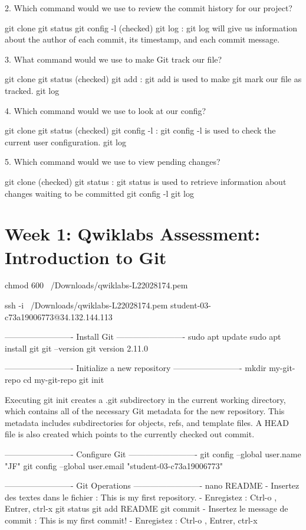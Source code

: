 \documentclass[11pt, onecolumn]{article}
\begin{document}
2. Which command would we use to review the commit history for our project?

git clone
git status
git config -l
(checked) git log : git log will give us information about the author of each commit, its timestamp, and each commit message.


3. What command would we use to make Git track our file?

git clone
git status
(checked) git add : git add is used to make git mark our file as tracked.
git log


4. Which command would we use to look at our config?

git clone
git status
(checked) git config -l  : git config -l is used to check the current user configuration.
git log


5. Which command would we use to view pending changes?

git clone
(checked) git status : git status is used to retrieve information about changes waiting to be committed
git config -l
git log


\section{Week 1: Qwiklabs Assessment: Introduction to Git}

chmod 600 ~/Downloads/qwiklabs-L22028174.pem

ssh -i ~/Downloads/qwiklabs-L22028174.pem student-03-c73a19006773@34.132.144.113

-------------------------
Install Git
-------------------------
sudo apt update
sudo apt install git
git --version
git version 2.11.0

-------------------------
Initialize a new repository
-------------------------
mkdir my-git-repo
cd my-git-repo
git init

Executing git init creates a .git subdirectory in the current working directory, which contains all of the necessary Git metadata for the new repository. This metadata includes subdirectories for objects, refs, and template files. A HEAD file is also created which points to the currently checked out commit.

-------------------------
Configure Git
-------------------------
git config --global user.name "JF"
git config --global user.email "student-03-c73a19006773"

-------------------------
Git Operations
-------------------------
nano README
- Insertez des textes dans le fichier : This is my first repository.
- Enregistez : Ctrl-o , Entrer, ctrl-x
git status
git add README
git commit
- Insertez le message de commit : This is my first commit!
- Enregistez : Ctrl-o , Entrer, ctrl-x
\end{document}

